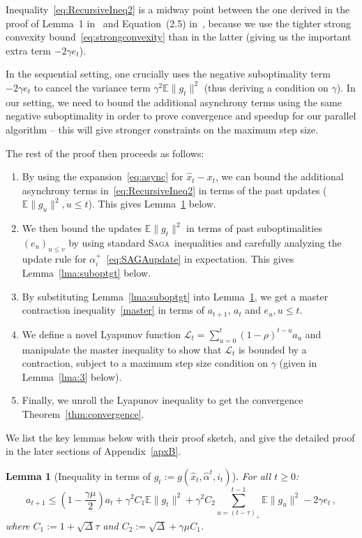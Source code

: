 \documentclass[twoside]{article}
\newcommand{\stepsize}{\gamma}
\newcommand{\strongconvex}{\mu}
\newcommand{\overlap}{\tau}
\newcommand{\contraction}{\rho}
\newcommand{\sparsity}{\Delta}
\newcommand{\lyapunov}{\mathcal{L}}
\newcommand{\E}{\mathbb{E}}
\newcommand{\SAGA}{\textsc{Saga}}
\newtheorem{lemma}{Lemma}
\begin{document}
Inequality~\eqref{eq:RecursiveIneq2} is a midway point between the one derived in the proof of Lemma~1 in~\citet{qsaga} and Equation~(2.5) in~\citet{mania}, because we use the tighter strong convexity bound~\eqref{eq:strongconvexity} than in the latter (giving us the important extra term $-2\stepsize e_t$). 

In the sequential setting, one crucially uses the negative suboptimality term $-2\stepsize e_t$ to cancel the variance term $\stepsize^2 \E \|g_t\|^2$ (thus deriving a condition on $\stepsize$).
In our setting, we need to bound the additional asynchrony terms using the same negative suboptimality in order to prove convergence and speedup for our parallel algorithm -- this will give stronger constraints on the maximum step size.

The rest of the proof then proceeds as follows:
\begin{enumerate}
\item By using the expansion~\eqref{eq:async} for $\hat{x}_t-x_t$, we can bound the additional asynchrony terms in~\eqref{eq:RecursiveIneq2} in terms of the past updates ($\E \|g_u\|^2, u\leq t$). This gives Lemma~\ref{lma:1} below.
\item We then bound the updates $\E \|g_t\|^2$ in terms of past suboptimalities $(e_u)_{u \leq v}$ by using standard \SAGA\ inequalities and carefully analyzing the update rule for $\alpha_i^+$~\eqref{eq:SAGAupdate} in expectation. This gives Lemma~\ref{lma:suboptgt} below.
\item By substituting Lemma~\ref{lma:suboptgt} into Lemma~\ref{lma:1}, we get a master contraction inequality~\eqref{master} in terms of $a_{t+1}$, $a_t$ and $e_u, u\leq t$.
\item We define a novel Lyapunov function $\lyapunov_t = \sum_{u=0}^t (1-\contraction)^{t-u}a_u$ and manipulate the master inequality to show that $\lyapunov_t$ is bounded by a contraction, subject to a maximum step size condition on $\stepsize$ (given in Lemma~\ref{lma:3} below).
\item Finally, we unroll the Lyapunov inequality to get the convergence Theorem~\ref{thm:convergence}.
\end{enumerate}
We list the key lemmas below with their proof sketch, and give the detailed proof in the later sections of Appendix~\ref{apxB}.

\begin{lemma}[Inequality in terms of $g_t := g(\hat x_{t}, \hat \alpha^t, i_{t})$]\label{lma:1}
For all $t \geq 0$:
\begin{equation} \label{eq:recursivegt}
a_{t+1} \leq 
	(1 - \frac{\stepsize\strongconvex}{2}) a_t + \stepsize^2 C_1\E\|g_t\|^2 
	+ \stepsize^2 C_2\sum_{u=(t-\overlap)_+}^{t-1}\E\|g_{u}\|^2 - 2\stepsize e_t  \, ,
\end{equation}
where 
$C_1 := 1 + \sqrt{\sparsity}\overlap$ and
$C_2 :=  \sqrt{\sparsity} + \stepsize\strongconvex C_1$.
\end{lemma}
\end{document}
